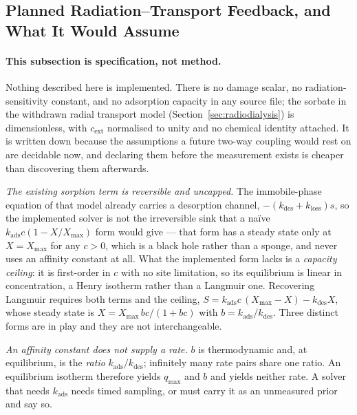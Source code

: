 \documentclass[11pt]{article}
\begin{document}
\subsection{Planned Radiation--Transport Feedback, and What It Would Assume}
\label{sec:planned_feedback}

\paragraph{This subsection is specification, not method.} Nothing described here is implemented.
There is no damage scalar, no radiation-sensitivity constant, and no adsorption capacity in any
source file; the sorbate in the withdrawn radial transport model (Section~\ref{sec:radiodialysis}) is dimensionless, with
$c_{\mathrm{ext}}$ normalised to unity and no chemical identity attached. It is written down
because the assumptions a future two-way coupling would rest on are decidable now, and declaring
them before the measurement exists is cheaper than discovering them afterwards.

\emph{The existing sorption term is reversible and uncapped.} The immobile-phase equation of that model already
carries a desorption channel, $-(k_{\mathrm{des}} + k_{\mathrm{loss}})s$, so the implemented
solver is not the irreversible sink that a na\"ive $k_{\mathrm{ads}}c(1 - X/X_{\max})$ form would
give --- that form has a steady state only at $X = X_{\max}$ for any $c > 0$, which is a black
hole rather than a sponge, and never uses an affinity constant at all. What the implemented form
lacks is a \emph{capacity ceiling}: it is first-order in $c$ with no site limitation, so its
equilibrium is linear in concentration, a Henry isotherm rather than a Langmuir one. Recovering
Langmuir requires both terms and the ceiling,
$S = k_{\mathrm{ads}}c\,(X_{\max} - X) - k_{\mathrm{des}}X$, whose steady state is
$X = X_{\max}\,bc/(1 + bc)$ with $b = k_{\mathrm{ads}}/k_{\mathrm{des}}$. Three distinct forms
are in play and they are not interchangeable.

\emph{An affinity constant does not supply a rate.} $b$ is thermodynamic and, at equilibrium, is
the \emph{ratio} $k_{\mathrm{ads}}/k_{\mathrm{des}}$; infinitely many rate pairs share one ratio.
An equilibrium isotherm therefore yields $q_{\max}$ and $b$ and yields neither rate. A solver that
needs $k_{\mathrm{ads}}$ needs timed sampling, or must carry it as an unmeasured prior and say so.
\end{document}
